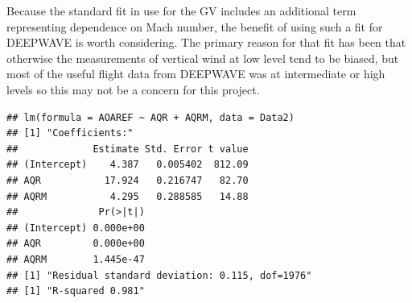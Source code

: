 \documentclass[12pt,twoside,english]{article}\usepackage[]{graphicx}\usepackage[]{color}
\makeatletter
\newenvironment{kframe}{%
 \def\at@end@of@kframe{}%
 \ifinner\ifhmode%
  \def\at@end@of@kframe{\end{minipage}}%
  \begin{minipage}{\columnwidth}%
 \fi\fi%
 \def\FrameCommand##1{\hskip\@totalleftmargin \hskip-\fboxsep
 \colorbox{shadecolor}{##1}\hskip-\fboxsep
     \hskip-\linewidth \hskip-\@totalleftmargin \hskip\columnwidth}%
 \MakeFramed {\advance\hsize-\width
   \@totalleftmargin\z@ \linewidth\hsize
   \@setminipage}}%
 {\par\unskip\endMakeFramed%
 \at@end@of@kframe}
\newenvironment{knitrout}{}{} %
\makeatother
\begin{document}

Because the standard fit in use for the GV includes an additional term representing dependence on Mach number, the benefit of using such a fit for DEEPWAVE is worth considering. The primary reason for that fit has been that otherwise the measurements of vertical wind at low level tend to be biased, but most of the useful flight data from DEEPWAVE was at intermediate or high levels so this may not be a concern for this project. 

\begin{knitrout}\footnotesize
{}\color{fgcolor}\begin{kframe}
\begin{verbatim}
## lm(formula = AOAREF ~ AQR + AQRM, data = Data2)
## [1] "Coefficients:"
##             Estimate Std. Error t value
## (Intercept)    4.387   0.005402  812.09
## AQR           17.924   0.216747   82.70
## AQRM           4.295   0.288585   14.88
##              Pr(>|t|)
## (Intercept) 0.000e+00
## AQR         0.000e+00
## AQRM        1.445e-47
## [1] "Residual standard deviation: 0.115, dof=1976"
## [1] "R-squared 0.981"
\end{verbatim}
\end{kframe}
\end{knitrout}
\end{document}
